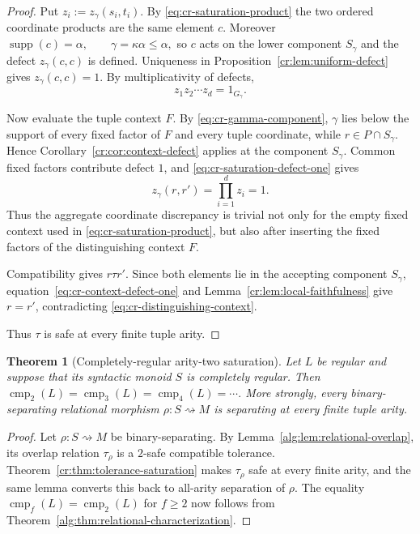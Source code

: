 \documentclass[10pt,a4paper]{article}
\newtheorem{theorem}{Theorem}[section]
\theoremstyle{definition}
\theoremstyle{remark}
\newcommand{\cmp}{\operatorname{cmp}}
\newcommand{\relto}{\mathrel{\rightsquigarrow}}
\begin{document}
\begin{proof}
Put \(z_i:=z_\gamma(s_i,t_i).\)  By \eqref{eq:cr-saturation-product} the two ordered
coordinate products are the same element $c$.  Moreover
\(\operatorname{supp}(c)=\alpha, \qquad \gamma=\kappa\alpha\le\alpha,\)
so $c$ acts on the lower component $S_\gamma$ and the defect
$z_\gamma(c,c)$ is defined.  Uniqueness in
Proposition~\ref{cr:lem:uniform-defect} gives $z_\gamma(c,c)=1$.
By multiplicativity of defects,
\begin{equation}
z_1z_2\cdots z_d
=
1_{G_\gamma}.
\label{eq:cr-saturation-defect-one}
\end{equation}

Now evaluate the tuple context $F$.  By \eqref{eq:cr-gamma-component}, $\gamma$ lies below
the support of every fixed factor of $F$ and every tuple coordinate, while
$r\in P\cap S_\gamma$.  Hence
Corollary~\ref{cr:cor:context-defect} applies at the component $S_\gamma$.
Common fixed factors contribute defect $1$, and \eqref{eq:cr-saturation-defect-one} gives
\begin{equation}
z_\gamma(r,r')
=
\prod_{i=1}^d z_i
=
1.
\label{eq:cr-context-defect-one}
\end{equation}
Thus the aggregate coordinate discrepancy is trivial not only for the empty
fixed context used in \eqref{eq:cr-saturation-product}, but also after inserting the fixed factors
of the distinguishing context $F$.

Compatibility gives \(r\tau r'.\)  Since both elements lie in the accepting
component $S_\gamma$, equation~\eqref{eq:cr-context-defect-one} and
Lemma~\ref{cr:lem:local-faithfulness} give $r=r'$, contradicting
\eqref{eq:cr-distinguishing-context}.

Thus $\tau$ is safe at every finite tuple arity. \end{proof}

\begin{theorem}[Completely-regular arity-two saturation]
\label{cr:thm:arity-two-saturation}
Let $L$ be regular and suppose that its syntactic monoid $S$ is completely
regular. Then
\(\cmp_2(L)=\cmp_3(L)=\cmp_4(L)=\cdots.\)
More strongly, every binary-separating relational morphism
$\rho:S\relto M$ is separating at every finite tuple arity.
\end{theorem}

\begin{proof}
Let \(\rho:S\relto M\) be binary-separating.  By
Lemma~\ref{alg:lem:relational-overlap}, its overlap relation \(\tau_\rho\) is a
\(2\)-safe compatible tolerance.  Theorem~\ref{cr:thm:tolerance-saturation}
makes \(\tau_\rho\) safe at every finite arity, and the same lemma converts
this back to all-arity separation of \(\rho\).  The equality
\(\cmp_f(L)=\cmp_2(L)\) for \(f\ge2\) now follows from
Theorem~\ref{alg:thm:relational-characterization}.
\end{proof}
\end{document}
